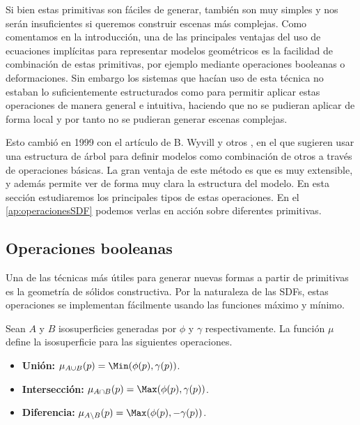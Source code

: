 
Si bien estas primitivas son fáciles de generar, también son muy simples y nos serán insuficientes si queremos construir escenas más complejas. Como comentamos en la introducción, una de las principales ventajas del uso de ecuaciones implícitas para representar modelos geométricos es la facilidad de combinación de estas primitivas, por ejemplo mediante operaciones booleanas o deformaciones. Sin embargo los sistemas que hacían uso de esta técnica no estaban lo suficientemente estructurados como para permitir aplicar estas operaciones de manera general e intuitiva, haciendo que no se pudieran aplicar de forma local y por tanto no se pudieran generar escenas complejas.\newline


Esto cambió en 1999 con el artículo de B. Wyvill y otros \cite{blobtree}, en el que sugieren usar una estructura de árbol para definir modelos como combinación de otros a través de operaciones básicas. La gran ventaja de este método es que es muy extensible, y además permite ver de forma muy clara la estructura del modelo. En esta sección estudiaremos los principales tipos de estas operaciones. En el \autoref{ap:operacionesSDF} podemos verlas en acción sobre diferentes primitivas.

\subsection{Operaciones booleanas}
Una de las técnicas más útiles para generar nuevas formas a partir de primitivas es la geometría de sólidos constructiva. Por la naturaleza de las SDFs, estas operaciones se implementan fácilmente usando las funciones máximo y mínimo.

\begin{definicion}\label{p:boolean}
    Sean $A$ y $B$ isosuperficies generadas por $\phi$ y $\gamma$ respectivamente. La función $\mu$ define la isosuperficie para las siguientes operaciones.
    \begin{itemize}
        \item \textbf{Unión: } $\mu_{A\cup B}(p) = \Min(\phi(p), \gamma(p))$.
        \item \textbf{Intersección: } $\mu_{A\cap B}(p) = \Max(\phi(p), \gamma(p))$.
        \item \textbf{Diferencia: } $\mu_{A\setminus B}(p) = \Max(\phi(p), -\gamma(p))$.
    \end{itemize}
\end{definicion}

